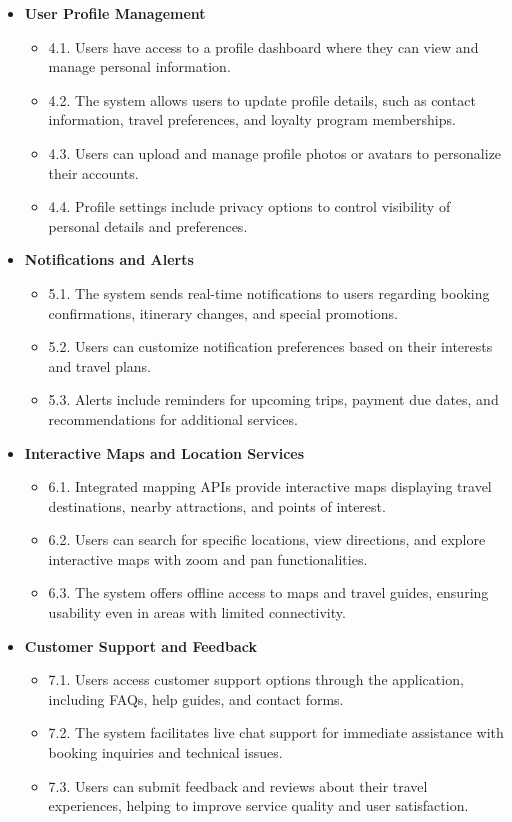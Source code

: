 \documentclass{scrreprt}
\begin{document}
\begin{itemize}
    \item \textbf{User Profile Management}
    \begin{itemize}
        \item 4.1. Users have access to a profile dashboard where they can view and manage personal information.
        \item 4.2. The system allows users to update profile details, such as contact information, travel preferences, and loyalty program memberships.
        \item 4.3. Users can upload and manage profile photos or avatars to personalize their accounts.
        \item 4.4. Profile settings include privacy options to control visibility of personal details and preferences.
    \end{itemize}
    
    \item \textbf{Notifications and Alerts}
    \begin{itemize}
        \item 5.1. The system sends real-time notifications to users regarding booking confirmations, itinerary changes, and special promotions.
        \item 5.2. Users can customize notification preferences based on their interests and travel plans.
        \item 5.3. Alerts include reminders for upcoming trips, payment due dates, and recommendations for additional services.
    \end{itemize}
    
    \item \textbf{Interactive Maps and Location Services}
    \begin{itemize}
        \item 6.1. Integrated mapping APIs provide interactive maps displaying travel destinations, nearby attractions, and points of interest.
        \item 6.2. Users can search for specific locations, view directions, and explore interactive maps with zoom and pan functionalities.
        \item 6.3. The system offers offline access to maps and travel guides, ensuring usability even in areas with limited connectivity.
    \end{itemize}
    
    \item \textbf{Customer Support and Feedback}
    \begin{itemize}
        \item 7.1. Users access customer support options through the application, including FAQs, help guides, and contact forms.
        \item 7.2. The system facilitates live chat support for immediate assistance with booking inquiries and technical issues.
        \item 7.3. Users can submit feedback and reviews about their travel experiences, helping to improve service quality and user satisfaction.
    \end{itemize}
    

\end{itemize}
\end{document}
